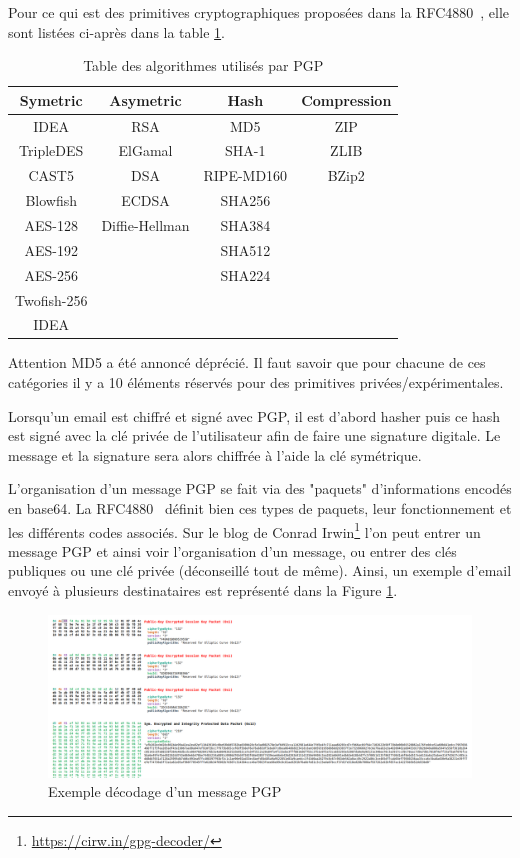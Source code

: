 Pour ce qui est des primitives cryptographiques proposées dans la RFC4880~\cite{RFC4880}, elle sont listées ci-après dans la table \ref{table:refPGPAlgos}.

\begin{table}[h!]
	\centering
	\begin{tabular}{||c c c c||}
		\hline
		Symetric & Asymetric & Hash & Compression \\ [0.5ex]
		\hline\hline
		IDEA & RSA & MD5 & ZIP \\
		TripleDES & ElGamal & SHA-1 & ZLIB \\
		CAST5 & DSA & RIPE-MD160 & BZip2 \\
		Blowfish & ECDSA & SHA256 & \\
		AES-128 & Diffie-Hellman & SHA384 & \\
		AES-192 & & SHA512 & \\
		AES-256 & & SHA224 & \\
		Twofish-256 & & & \\
		IDEA & & & \\
		\hline
	\end{tabular}
\caption{Table des algorithmes utilisés par PGP}
\label{table:refPGPAlgos}
\end{table}

Attention MD5 a été annoncé déprécié. Il faut savoir que pour chacune de ces catégories il y a 10 éléments réservés pour des primitives privées/expérimentales.

Lorsqu'un email est chiffré et signé avec PGP, il est d'abord hasher puis ce hash est signé avec la clé privée de l'utilisateur afin de faire une signature digitale. Le message et la signature sera alors chiffrée à l'aide la clé symétrique.

L'organisation d'un message PGP se fait via des "paquets" d'informations encodés en base64. La RFC4880~\cite{RFC4880} définit bien ces types de paquets, leur fonctionnement et les différents codes associés. Sur le blog de Conrad Irwin\footnote{\url{https://cirw.in/gpg-decoder/}} l'on peut entrer un message PGP et ainsi voir l'organisation d'un message, ou entrer des clés publiques ou une clé privée (déconseillé tout de même). Ainsi, un exemple d'email envoyé à plusieurs destinataires est représenté dans la Figure \ref{fig:PGP_DECODE}. 

\begin{figure}[h!]
	\includegraphics[width=\textwidth]{images/examplePGPDecode.png}
	\centering
	\caption{Exemple décodage d'un message PGP}
	\label{fig:PGP_DECODE}
\end{figure}

